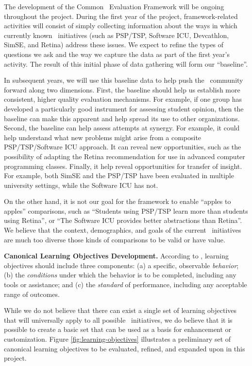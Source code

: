 The development of the Common \eCT\ Evaluation Framework will be ongoing
throughout the project.  During the first year of the project,
framework-related activities will consist of simply collecting information
about the ways in which currently known \eCT\ initiatives (such as PSP/TSP,
Software ICU, Devcathlon, SimSE, and Retina) address these issues.   We expect to 
refine the types of questions we ask and the way we capture the data as
part of the first year's activity. The result of this initial phase of data
gathering will form our ``baseline''. 

In subsequent years, we will use this baseline data to help push the \eCT\
community forward along two dimensions. First, the baseline should help us
establish more consistent, higher quality evaluation mechanisms. For
example, if one group has developed a particularly good instrument for
assessing student opinion, then the baseline can make this apparent and
help spread its use to other organizations.  Second, the baseline can
help assess attempts at synergy.  For example, it could help understand what 
new problems might arise from a composite PSP/TSP/Software ICU approach. 
It can reveal new opportunities, such as the possibility of adapting the 
Retina recommendation for use in advanced computer programming classes. 
Finally, it help reveal opportunities for transfer of insight. For example, 
both SimSE and the PSP/TSP have been evaluated in multiple university settings, 
while the Software ICU has not. 

On the other hand, it is not our goal for the framework to enable ``apples
to apples'' comparisons, such as ``Students using PSP/TSP learn more than
students using Retina'', or ``The Software ICU provides better abstractions
than Retina''.  We believe that the context, demographics, and goals of the
current \eCT\ initiatives are much too diverse those kinds of comparisons
to be valid or have value.

{\bf Canonical Learning Objectives Development.}  According to
\cite{Mager62}, learning objectives should include three components: (a) a
specific, observable {\em behavior}; (b) the {\em conditions} under which
the behavior is to be completed, including any tools or assistance; and (c)
the {\em standard} of performance, including any acceptable range of
outcomes.

While we do not believe that there can exist a single set of learning
objectives that will universally apply to all possible \eCT\ initiatives,
we do believe that it is possible to create a basic set that can be used as
a basis for enhancement or customization.  Figure
\ref{fig:learning-objectives} illustrates a preliminary set of canonical
learning objectives to be evaluated, refined, and expanded upon in this project.

